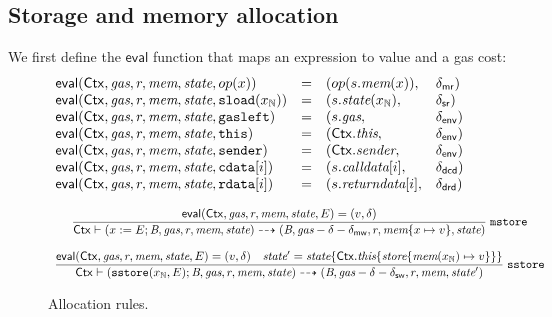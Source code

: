 \def\eval{\mathsf{eval}}
\subsection{Storage and memory allocation}
We first define the $\eval$ function that maps an expression to value and a gas cost:
$$
\begin{array}{llll}
    \eval(\ctx, \textit{gas},r,\memory,\state, op(x)) &=& 
    (op(s.\memory(x)),&\dmr) \\
    \eval(\ctx, \textit{gas},r,\memory,\state, \sload{x_\Nat}) &=& (s.\state(x_\Nat),&\dsr)\\
    \eval(\ctx, \textit{gas}, r,\memory,\state, \mathtt{gasleft}) &=& (s.\textit{gas},&\denv) \\
    \eval(\ctx,\textit{gas}, r,\memory,\state,\mathtt{this}) &=& (\ctx.\thisVal,&\denv) \\
    \eval(\ctx, \textit{gas}, r,\memory,\state, \mathtt{sender}) &=& (\ctx.\senderVal,&\denv) \\
    \eval(\ctx, \textit{gas}, r,\memory,\state,\bcd[i]) &=& (s.\callDataVal[i],&\dcd) \\
    \eval(\ctx, \textit{gas}, r,\memory,\state,\brd[i]) &=& (s.\returnDataVal[i],&\drd)
\end{array}
$$
\begin{figure}[ht]
$$
\begin{array}{c}
\dfrac{
\eval(\ctx,\textit{gas}, r,\memory,\state,E) = (v,\delta) 
}
{
\ctx\vdash 
(x:=E;\bytecode,\textit{gas}, r, \memory,\state) 
\rar 
(\bytecode,\textit{gas}-\delta-\delta_\mathsf{mw}, r,\memory\set{x\mapsto v},\state)
}\rlab{mstore}
\\\\
\dfrac{
\eval(\ctx,\textit{gas}, r,\memory,\state,E) = (v,\delta)
\quad
\state' = \state\set{\ctx.\thisVal\set{\store\set{\memory(x_\Nat)\mapsto v}}}
}
{
\ctx\vdash 
(\sstore{x_\Nat,E};\bytecode,\textit{gas}, r, \memory,\state) 
\rar 
(\bytecode,\textit{gas}-\delta-\delta_\mathsf{sw}, r,\memory,\state')
}\rlab{sstore}
\end{array}
$$
\caption{Allocation rules.}
\end{figure}